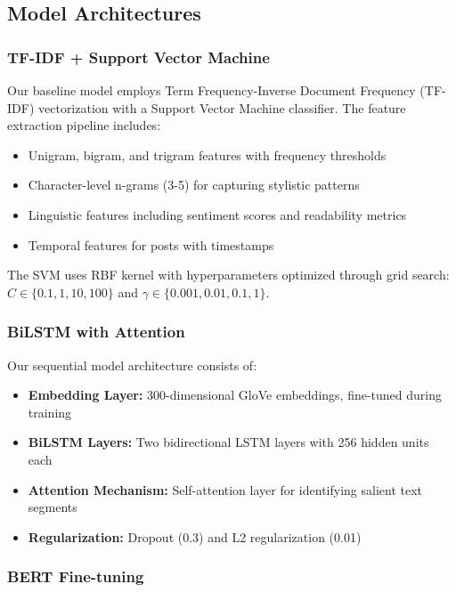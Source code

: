 \documentclass[conference]{IEEEtran}
\begin{document}
\subsection{Model Architectures}

\subsubsection{TF-IDF + Support Vector Machine}

Our baseline model employs Term Frequency-Inverse Document Frequency (TF-IDF) vectorization with a Support Vector Machine classifier. The feature extraction pipeline includes:

\begin{itemize}
    \item Unigram, bigram, and trigram features with frequency thresholds
    \item Character-level n-grams (3-5) for capturing stylistic patterns
    \item Linguistic features including sentiment scores and readability metrics
    \item Temporal features for posts with timestamps
\end{itemize}

The SVM uses RBF kernel with hyperparameters optimized through grid search: $C \in \{0.1, 1, 10, 100\}$ and $\gamma \in \{0.001, 0.01, 0.1, 1\}$.

\subsubsection{BiLSTM with Attention}

Our sequential model architecture consists of:

\begin{itemize}
    \item \textbf{Embedding Layer:} 300-dimensional GloVe embeddings, fine-tuned during training
    \item \textbf{BiLSTM Layers:} Two bidirectional LSTM layers with 256 hidden units each
    \item \textbf{Attention Mechanism:} Self-attention layer for identifying salient text segments
    \item \textbf{Regularization:} Dropout (0.3) and L2 regularization (0.01)
\end{itemize}

\subsubsection{BERT Fine-tuning}
\end{document}

